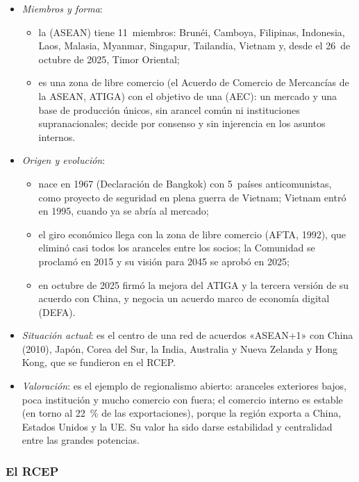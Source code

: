 \documentclass[11pt]{article}
\begin{document}
\begin{itemize}
\item \emph{Miembros y forma}:
  \begin{itemize}
  \item la  (ASEAN) tiene 11~miembros: Brunéi, Camboya, Filipinas, Indonesia, Laos, Malasia, Myanmar, Singapur, Tailandia, Vietnam y, desde el 26~de octubre de 2025, Timor Oriental\nocite{ASEAN2025TimorOriental};
  \item es una zona de libre comercio (el Acuerdo de Comercio de Mercancías de la ASEAN, ATIGA) con el objetivo de una  (AEC): un mercado y una base de producción únicos, sin arancel común ni instituciones supranacionales; decide por consenso y sin injerencia en los asuntos internos.
  \end{itemize}
\item \emph{Origen y evolución}:
  \begin{itemize}
  \item nace en 1967 (Declaración de Bangkok) con 5~países anticomunistas, como proyecto de seguridad en plena guerra de Vietnam\nocite{ASEAN2026Founding}; Vietnam entró en 1995, cuando ya se abría al mercado;
  \item el giro económico llega con la zona de libre comercio (AFTA, 1992), que eliminó casi todos los aranceles entre los socios; la Comunidad se proclamó en 2015 y su visión para 2045 se aprobó en 2025;
  \item en octubre de 2025 firmó la mejora del ATIGA y la tercera versión de su acuerdo con China\nocite{MTI2025ATIGA}, y negocia un acuerdo marco de economía digital (DEFA).
  \end{itemize}
\item \emph{Situación actual}: es el centro de una red de acuerdos «ASEAN+1» con China (2010), Japón, Corea del Sur, la India, Australia y Nueva Zelanda y Hong Kong, que se fundieron en el RCEP.
\item \emph{Valoración}: es el ejemplo de regionalismo abierto: aranceles exteriores bajos, poca institución y mucho comercio con fuera; el comercio interno es estable (en torno al 22~\% de las exportaciones), porque la región exporta a China, Estados Unidos y la UE. Su valor ha sido darse estabilidad y centralidad entre las grandes potencias.
\end{itemize}

\subsubsection{El RCEP}\label{sec:rcep}
\end{document}
